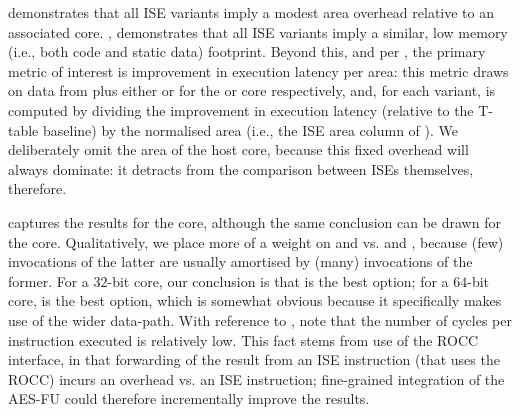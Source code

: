 
demonstrates that all ISE variants
imply a modest area overhead relative to an associated core.
,
demonstrates that all ISE variants
imply a similar, low memory (i.e., both code and static data) footprint.
Beyond this, and per 
,
the primary metric of interest is
improvement in execution latency per area:
this metric draws on data from
plus either
or
for the  or  core respectively,
and, for each variant, is computed by dividing the improvement in execution 
latency (relative to the T-table baseline) by the normalised area (i.e., the 
ISE area column of ).  We deliberately omit the area of
the host core, because this fixed overhead will always dominate: it detracts 
from the comparison between ISEs themselves, therefore.

captures the results for the  core, although the same conclusion can 
be drawn for the  core.  Qualitatively, we place more of a weight on 
and 
vs.
and 
,
because
 (few) invocations of the latter 
are usually amortised by 
(many) invocations of the former.
For a $32$-bit core, our conclusion is that
is the best option;
for a $64$-bit core,
is the best option, which is somewhat obvious because it specifically makes
use of the wider data-path.
With reference to
, 
note that the number of cycles per instruction executed is relatively low.
This fact stems from use of the ROCC interface, in that forwarding of the 
result from an ISE instruction (that uses the ROCC) incurs an overhead vs. 
an ISE instruction; fine-grained integration of the AES-FU could therefore
incrementally improve the results.


